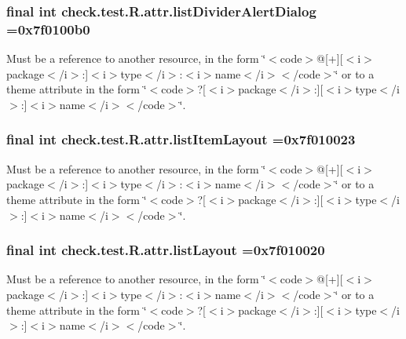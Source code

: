 \subsubsection[{list\+Divider\+Alert\+Dialog}]{\setlength{\rightskip}{0pt plus 5cm}final int check.\+test.\+R.\+attr.\+list\+Divider\+Alert\+Dialog =0x7f0100b0\hspace{0.3cm}{\ttfamily [static]}}\label{classcheck_1_1test_1_1_r_1_1attr_afac1cbbb1b94904e17111d40e56cd3dd}
Must be a reference to another resource, in the form \char`\"{}$<$code$>$@\mbox{[}+\mbox{]}\mbox{[}$<$i$>$package$<$/i$>$\+:\mbox{]}$<$i$>$type$<$/i$>$\+:$<$i$>$name$<$/i$>$$<$/code$>$\char`\"{} or to a theme attribute in the form \char`\"{}$<$code$>$?\mbox{[}$<$i$>$package$<$/i$>$\+:\mbox{]}\mbox{[}$<$i$>$type$<$/i$>$\+:\mbox{]}$<$i$>$name$<$/i$>$$<$/code$>$\char`\"{}. \hypertarget{classcheck_1_1test_1_1_r_1_1attr_a48d0f730be695f88e2bd71a69c0605d8}{}
\subsubsection[{list\+Item\+Layout}]{\setlength{\rightskip}{0pt plus 5cm}final int check.\+test.\+R.\+attr.\+list\+Item\+Layout =0x7f010023\hspace{0.3cm}{\ttfamily [static]}}\label{classcheck_1_1test_1_1_r_1_1attr_a48d0f730be695f88e2bd71a69c0605d8}
Must be a reference to another resource, in the form \char`\"{}$<$code$>$@\mbox{[}+\mbox{]}\mbox{[}$<$i$>$package$<$/i$>$\+:\mbox{]}$<$i$>$type$<$/i$>$\+:$<$i$>$name$<$/i$>$$<$/code$>$\char`\"{} or to a theme attribute in the form \char`\"{}$<$code$>$?\mbox{[}$<$i$>$package$<$/i$>$\+:\mbox{]}\mbox{[}$<$i$>$type$<$/i$>$\+:\mbox{]}$<$i$>$name$<$/i$>$$<$/code$>$\char`\"{}. \hypertarget{classcheck_1_1test_1_1_r_1_1attr_a73e1a0b98c2b12f1eb61b082e6a2c468}{}
\subsubsection[{list\+Layout}]{\setlength{\rightskip}{0pt plus 5cm}final int check.\+test.\+R.\+attr.\+list\+Layout =0x7f010020\hspace{0.3cm}{\ttfamily [static]}}\label{classcheck_1_1test_1_1_r_1_1attr_a73e1a0b98c2b12f1eb61b082e6a2c468}
Must be a reference to another resource, in the form \char`\"{}$<$code$>$@\mbox{[}+\mbox{]}\mbox{[}$<$i$>$package$<$/i$>$\+:\mbox{]}$<$i$>$type$<$/i$>$\+:$<$i$>$name$<$/i$>$$<$/code$>$\char`\"{} or to a theme attribute in the form \char`\"{}$<$code$>$?\mbox{[}$<$i$>$package$<$/i$>$\+:\mbox{]}\mbox{[}$<$i$>$type$<$/i$>$\+:\mbox{]}$<$i$>$name$<$/i$>$$<$/code$>$\char`\"{}. \hypertarget{classcheck_1_1test_1_1_r_1_1attr_a41c863e947df5917e6718786a094a95d}{}
